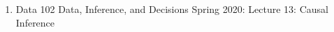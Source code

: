 \begin{enumerate}
    \item Data 102 Data, Inference, and Decisions Spring 2020: Lecture 13: Causal Inference
\end{enumerate}